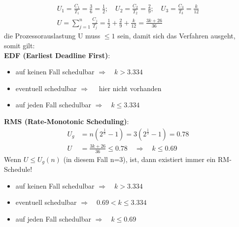\documentclass[12pt,a4paper,ngerman]{article}
\begin{document}
\begin{align*}
U_1 = \frac{C_1}{T_1} = \frac{3}{6} = \frac{1}{2}; \quad U_2 = \frac{C_2}{T_2} = \frac{2}{9}; \quad
U_3 = \frac{C_3}{T_3} = \frac{k}{12} \\
U = \sum_{j=1}^{n} \frac{C_j}{T_j} = \frac{1}{2} + \frac{2}{9} + \frac{k}{12} = \frac{3k+26}{36}
\end{align*}
die Prozessorauslastung U muss $\leq 1$ sein, damit sich das Verfahren ausgeht, somit gilt: \\
\textbf{EDF (Earliest Deadline First)}: \\
\begin{itemize}
\item auf keinen Fall schedulbar $\Rightarrow \quad k > 3.334$
\item eventuell schedulbar $\Rightarrow \quad$ hier nicht vorhanden
\item auf jeden Fall schedulbar $\Rightarrow \quad k \leq 3.334$
\end{itemize}
\textbf{RMS (Rate-Monotonic Scheduling)}: \\
\begin{align*}
U_g &= n(2^{\frac{1}{n}}-1) = 3 (2^{\frac{1}{3}}-1) = 0.78 \\
U &= \frac{3k+26}{36} \leq 0.78 \quad \Rightarrow \quad k \leq 0.69
\end{align*}
Wenn $U\leq U_g(n)$ (in diesem Fall n=3), ist, dann existiert immer ein RM-Schedule!
\begin{itemize}
\item auf keinen Fall schedulbar $\Rightarrow \quad k > 3.334$
\item eventuell schedulbar $\Rightarrow \quad 0.69 < k \leq 3.334$
\item auf jeden Fall schedulbar $\Rightarrow \quad k \leq 0.69$
\end{itemize}




   
   
\end{document}
